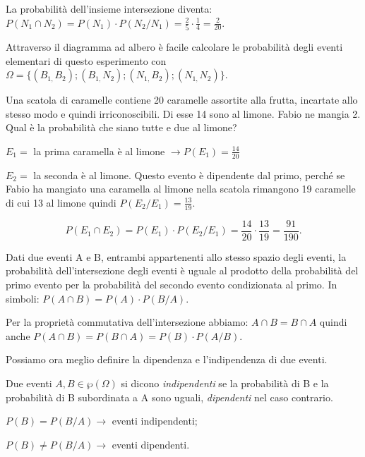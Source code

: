 \begin{esempio}
\begin{center}
\begin{tikzpicture}[x=10mm,y=10mm,font=\small]
\end{tikzpicture}

\end{center}

La probabilità dell'insieme intersezione diventa: $P(N_1\cap N_2)=P(N_1)\cdot 
P(N_2/N_1)=\frac 2 5\cdot \frac 1 4=\frac 2{20}$.

Attraverso il diagramma ad albero è facile calcolare le probabilità degli 
eventi 
elementari di questo esperimento con $\Omega 
=\{(B_{1,}B_2);(B_{1,}N_2);(N_{1,}B_2);(N_{1,}N_2)\}$.
\end{esempio}

\begin{esempio}
Una scatola di caramelle contiene 20 caramelle assortite alla frutta, 
incartate 
allo stesso modo e quindi irriconoscibili. Di esse 14 sono al limone. Fabio 
ne 
mangia 2. Qual è la probabilità che siano tutte e due al limone?
\begin{itemize*}
\item $E_1=$ la prima caramella è al limone $\to P(E_1)=\frac{14}{20}$
\item $E_2=$ la seconda è al limone. Questo evento è dipendente dal primo, 
perché se Fabio ha mangiato una caramella al limone nella scatola rimangono 
19 
caramelle di cui 13 al limone quindi $P(E_2/E_1)=\frac{13}{19}$.
\end{itemize*}
\[P(E_1\cap E_2)=P(E_1)\cdot P(E_2/E_1)=\frac{14}{20}\cdot 
\frac{13}{19}=\frac{91}{190}.\]
\end{esempio}

\begin{teorema}
Dati due eventi A e B, entrambi appartenenti allo stesso spazio degli eventi, 
la 
probabilità dell'intersezione degli eventi è uguale al prodotto della 
probabilità del primo evento per la probabilità del secondo evento 
condizionata 
al primo. In simboli: $P(A\cap B)=P(A)\cdot P(B/A)$.
\end{teorema}

Per la proprietà commutativa dell'intersezione abbiamo: $A\cap B=B\cap A$ 
quindi 
anche $P(A\cap B)=P(B\cap A)=P(B)\cdot P(A/B)$.

Possiamo ora meglio definire la dipendenza e l'indipendenza di due eventi.

\begin{definizione}
Due eventi $A,B\in \wp (\Omega )$ si dicono \emph{indipendenti} se la 
probabilità di B e la probabilità di B subordinata a A sono uguali, 
\emph{dipendenti} nel caso contrario.

$P(B)=P(B/A)\to$ eventi indipendenti;

 ${P}(B)\neq P(B/A)\to$ eventi dipendenti.
\end{definizione}

